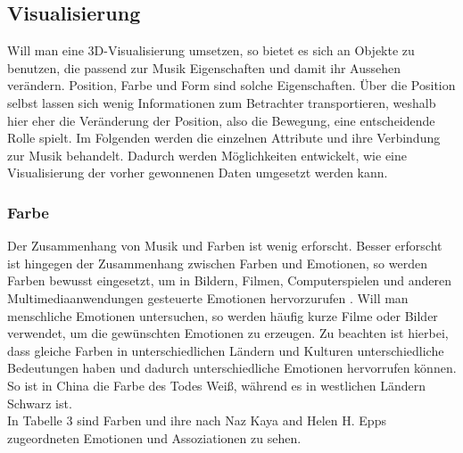 \documentclass[11pt,a4paper]{article}
\begin{document}
\subsection{Visualisierung}
Will man eine 3D-Visualisierung umsetzen, so bietet es sich an Objekte zu benutzen, die passend zur Musik Eigenschaften
und damit ihr Aussehen verändern. Position, Farbe und Form sind solche Eigenschaften. Über die Position selbst lassen sich wenig Informationen zum Betrachter transportieren, weshalb hier eher die Veränderung der Position, also die Bewegung, eine entscheidende Rolle spielt. Im Folgenden werden die einzelnen Attribute und ihre Verbindung zur Musik behandelt. Dadurch werden Möglichkeiten entwickelt, wie eine Visualisierung der vorher gewonnenen Daten umgesetzt werden kann.

\subsubsection{Farbe}
Der Zusammenhang von Musik und Farben ist wenig erforscht. Besser erforscht ist hingegen der Zusammenhang zwischen Farben und Emotionen, so werden Farben bewusst eingesetzt, um in Bildern, Filmen, Computerspielen und anderen Multimediaanwendungen gesteuerte Emotionen hervorzurufen \cite{10.3389/fpsyg.2017.00440}. Will man menschliche Emotionen untersuchen, so werden häufig kurze Filme oder Bilder verwendet, um die gewünschten Emotionen zu erzeugen. Zu beachten ist hierbei, dass gleiche Farben in unterschiedlichen Ländern und Kulturen unterschiedliche Bedeutungen haben und dadurch unterschiedliche Emotionen hervorrufen können. So ist in China die Farbe des Todes Weiß, während es in westlichen Ländern Schwarz ist.\\
In Tabelle 3 sind Farben und ihre nach Naz Kaya and Helen H. Epps
 \cite{c0f471f7e6a618d880cf25175c9f99ac97ef8ba7d016c7f8c523f8d902892d9e} zugeordneten Emotionen und Assoziationen zu sehen.

\end{document}
